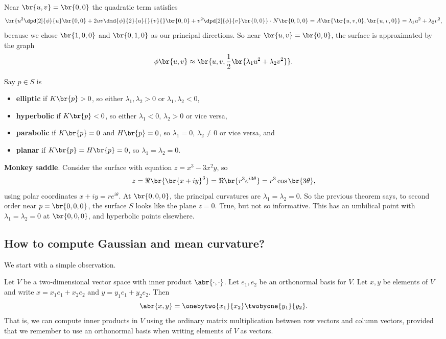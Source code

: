 \pagebreak

Near $ \br{u, v} = \br{0, 0} $ the quadratic term satisfies
$$ \br{u^2\dpd[2]{\phi}{u}\br{0, 0} + 2uv\dmd{\phi}{2}{u}{}{v}{}\br{0, 0} + v^2\dpd[2]{\phi}{v}\br{0, 0}} \cdot N\br{0, 0, 0} = A\br{\br{u, v, 0}, \br{u, v, 0}} = \lambda_1u^2 + \lambda_2v^2, $$
because we chose $ \br{1, 0, 0} $ and $ \br{0, 1, 0} $ as our principal directions. So near $ \br{u, v} = \br{0, 0} $, the surface is approximated by the graph
$$ \phi\br{u, v} \approx \br{u, v, \dfrac{1}{2}\br{\lambda_1u^2 + \lambda_2v^2}}. $$


Say $ p \in S $ is
\begin{itemize}
\item \textbf{elliptic} if $ K\br{p} > 0 $, so either $ \lambda_1, \lambda_2 > 0 $ or $ \lambda_1, \lambda_2 < 0 $,
\item \textbf{hyperbolic} if $ K\br{p} < 0 $, so either $ \lambda_1 < 0 $, $ \lambda_2 > 0 $ or vice versa,
\item \textbf{parabolic} if $ K\br{p} = 0 $ and $ H\br{p} = 0 $, so $ \lambda_1 = 0 $, $ \lambda_2 \ne 0 $ or vice versa, and
\item \textbf{planar} if $ K\br{p} = H\br{p} = 0 $, so $ \lambda_1 = \lambda_2 = 0 $.
\end{itemize}

\begin{example*}
\textbf{Monkey saddle}. Consider the surface with equation $ z = x^3 - 3x^2y $, so
$$ z = \Re\br{\br{x + iy}^3} = \Re\br{r^3e^{i3\theta}} = r^3\cos\br{3\theta}, $$
using polar coordinates $ x + iy = re^{i\theta} $. At $ \br{0, 0, 0} $, the principal curvatures are $ \lambda_1 = \lambda_2 = 0 $. So the previous theorem says, to second order near $ p = \br{0, 0, 0} $, the surface $ S $ looks like the plane $ z = 0 $. True, but not so informative. This has an umbilical point with $ \lambda_1 = \lambda_2 = 0 $ at $ \br{0, 0, 0} $, and hyperbolic points elsewhere.
\end{example*}

\subsection{How to compute Gaussian and mean curvature?}

We start with a simple observation.

\begin{lemma}
\label{lem:innerproduct}
Let $ V $ be a two-dimensional vector space with inner product $ \abr{\cdot, \cdot} $. Let $ e_1, e_2 $ be an orthonormal basis for $ V $. Let $ x, y $ be elements of $ V $ and write $ x = x_1e_1 + x_2e_2 $ and $ y = y_1e_1 + y_2e_2 $. Then
$$ \abr{x, y} = \onebytwo{x_1}{x_2}\twobyone{y_1}{y_2}. $$
That is, we can compute inner products in $ V $ using the ordinary matrix multiplication between row vectors and column vectors, provided that we remember to use an orthonormal basis when writing elements of $ V $ as vectors.
\end{lemma}

